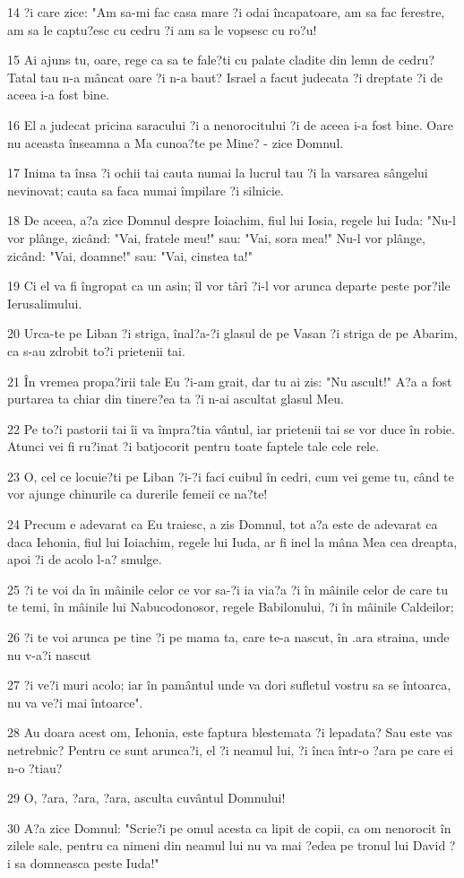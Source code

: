 \par 14 ?i care zice: "Am sa-mi fac casa mare ?i odai încapatoare, am sa fac ferestre, am sa le captu?esc cu cedru ?i am sa le vopsesc cu ro?u!
\par 15 Ai ajuns tu, oare, rege ca sa te fale?ti cu palate cladite din lemn de cedru? Tatal tau n-a mâncat oare ?i n-a baut? Israel a facut judecata ?i dreptate ?i de aceea i-a fost bine.
\par 16 El a judecat pricina saracului ?i a nenorocitului ?i de aceea i-a fost bine. Oare nu aceasta înseamna a Ma cunoa?te pe Mine? - zice Domnul.
\par 17 Inima ta însa ?i ochii tai cauta numai la lucrul tau ?i la varsarea sângelui nevinovat; cauta sa faca numai împilare ?i silnicie.
\par 18 De aceea, a?a zice Domnul despre Ioiachim, fiul lui Iosia, regele lui Iuda: "Nu-l vor plânge, zicând: "Vai, fratele meu!" sau: "Vai, sora mea!" Nu-l vor plânge, zicând: "Vai, doamne!" sau: "Vai, cinstea ta!"
\par 19 Ci el va fi îngropat ca un asin; îl vor târî ?i-l vor arunca departe peste por?ile Ierusalimului.
\par 20 Urca-te pe Liban ?i striga, înal?a-?i glasul de pe Vasan ?i striga de pe Abarim, ca s-au zdrobit to?i prietenii tai.
\par 21 În vremea propa?irii tale Eu ?i-am grait, dar tu ai zis: "Nu ascult!" A?a a fost purtarea ta chiar din tinere?ea ta ?i n-ai ascultat glasul Meu.
\par 22 Pe to?i pastorii tai îi va împra?tia vântul, iar prietenii tai se vor duce în robie. Atunci vei fi ru?inat ?i batjocorit pentru toate faptele tale cele rele.
\par 23 O, cel ce locuie?ti pe Liban ?i-?i faci cuibul în cedri, cum vei geme tu, când te vor ajunge chinurile ca durerile femeii ce na?te!
\par 24 Precum e adevarat ca Eu traiesc, a zis Domnul, tot a?a este de adevarat ca daca Iehonia, fiul lui Ioiachim, regele lui Iuda, ar fi inel la mâna Mea cea dreapta, apoi ?i de acolo l-a? smulge.
\par 25 ?i te voi da în mâinile celor ce vor sa-?i ia via?a ?i în mâinile celor de care tu te temi, în mâinile lui Nabucodonosor, regele Babilonului, ?i în mâinile Caldeilor;
\par 26 ?i te voi arunca pe tine ?i pe mama ta, care te-a nascut, în .ara straina, unde nu v-a?i nascut
\par 27 ?i ve?i muri acolo; iar în pamântul unde va dori sufletul vostru sa se întoarca, nu va ve?i mai întoarce".
\par 28 Au doara acest om, Iehonia, este faptura blestemata ?i lepadata? Sau este vas netrebnic? Pentru ce sunt arunca?i, el ?i neamul lui, ?i înca într-o ?ara pe care ei n-o ?tiau?
\par 29 O, ?ara, ?ara, ?ara, asculta cuvântul Domnului!
\par 30 A?a zice Domnul: "Scrie?i pe omul acesta ca lipit de copii, ca om nenorocit în zilele sale, pentru ca nimeni din neamul lui nu va mai ?edea pe tronul lui David ?i sa domneasca peste Iuda!"

